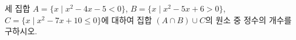 세 집합 $A=\{x \mid x^2-4x-5<0\}$, $B=\{x \mid x^2-5x+6>0\}$, $C=\{x \mid x^2-7x+10\le 0\}$에 대하여 집합 $(A\cap B)\cup C$의 원소 중 정수의 개수를 구하시오.
